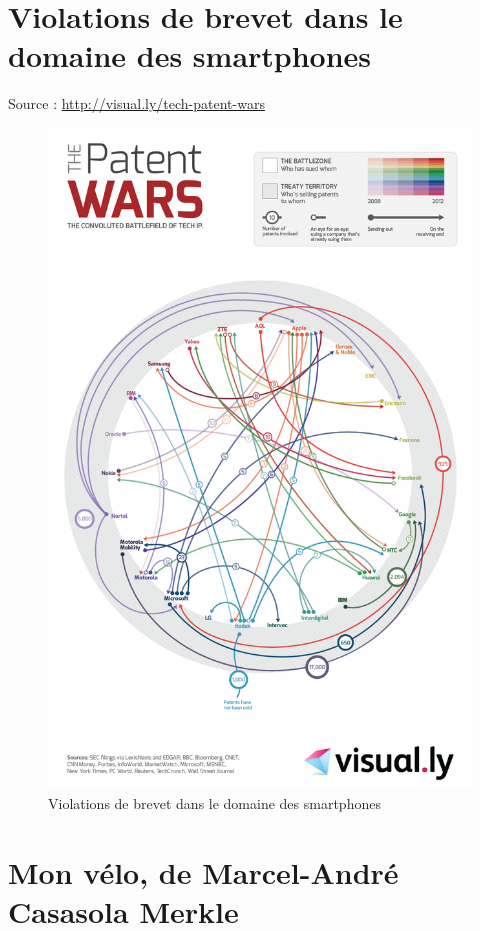 \chapter{Violations de brevet dans le domaine des smartphones}
\label{annexe-smartphones}

Source : \url{http://visual.ly/tech-patent-wars}

\newpage

\begin{figure}[H]
\center
\includegraphics[scale=.442]{images/patent-wars.png}
\caption{Violations de brevet dans le domaine des smartphones}
\end{figure}

\chapter{Mon vélo, de Marcel-André Casasola Merkle}
\label{annexe-velo}

